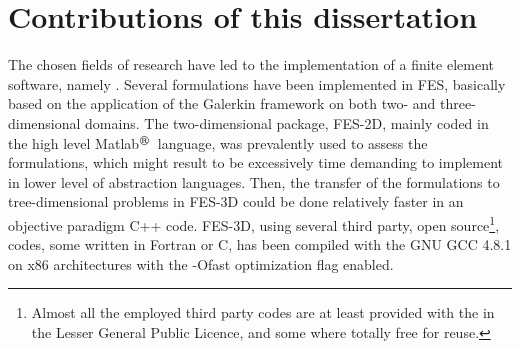 \section{Contributions of this dissertation}

The chosen fields of research have led to the implementation of a finite element software, namely . Several formulations have been implemented in FES, basically based on the application of the Galerkin framework on both two- and three-dimensional domains. The two-dimensional package, FES-2D, mainly coded in the high level Matlab$^\text{\circledR}$~language, was prevalently used to assess the formulations, which might result to be excessively time demanding to implement in lower level of abstraction languages. Then, the transfer of the formulations to tree-dimensional problems in FES-3D could be done relatively faster in an objective paradigm C++ code. FES-3D, using several third party, open source\footnote{Almost all the employed third party codes are at least provided with the in the Lesser General Public Licence, and some where totally free for reuse.}, codes, some written in Fortran or C, has been compiled with the GNU GCC 4.8.1 on {x86} architectures with the -Ofast optimization flag enabled.

